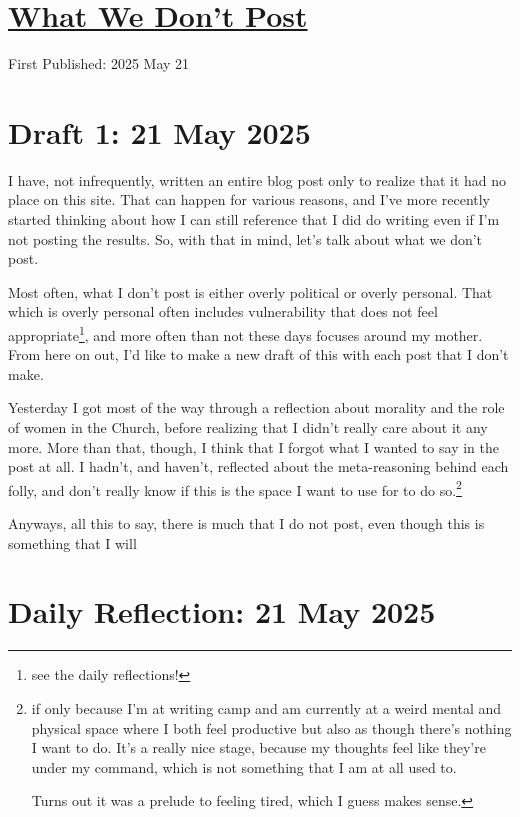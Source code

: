 \documentclass[12pt]{article}
\renewcommand{\,}{\textsuperscript{,}}
\begin{document}
  
\doublespacing  
\section{\href{what-we-dont-post.html}{What We Don't Post}}  
First Published: 2025 May 21

\section{Draft 1: 21 May 2025}

I have, not infrequently, written an entire blog post only to realize that it had no place on this site.  
That can happen for various reasons, and I've more recently started thinking about how I can still reference that I did do writing even if I'm not posting the results.  
So, with that in mind, let's talk about what we don't post.

Most often, what I don't post is either overly political or overly personal.  
That which is overly personal often includes vulnerability that does not feel appropriate\footnote{see the daily reflections!}, and more often than not these days focuses around my mother.  
From here on out, I'd like to make a new draft of this with each post that I don't make.

Yesterday I got most of the way through a reflection about morality and the role of women in the Church, before realizing that I didn't really care about it any more.  
More than that, though, I think that I forgot what I wanted to say in the post at all.  
I hadn't, and haven't, reflected about the meta-reasoning behind each folly, and don't really know if this is the space I want to use for to do so.\footnote{if only because I'm at writing camp and am currently at a weird mental and physical space where I both feel productive but also as though there's nothing I want to do. It's a really nice stage, because my thoughts feel like they're under my command, which is not something that I am at all used to.

Turns out it was a prelude to feeling tired, which I guess makes sense.}

Anyways, all this to say, there is much that I do not post, even though this is something that I will

\section{Daily Reflection: 21 May 2025}
\end{document}
